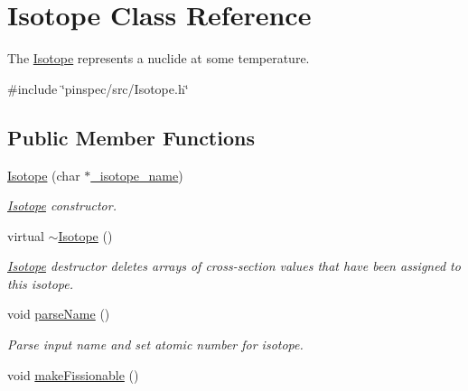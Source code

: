 \hypertarget{classIsotope}{\section{Isotope Class Reference}
\label{classIsotope}
}


The \hyperlink{classIsotope}{Isotope} represents a nuclide at some temperature.  




{\ttfamily \#include \char`\"{}pinspec/src/\-Isotope.\-h\char`\"{}}

\subsection*{Public Member Functions}
\begin{DoxyCompactItemize}
\item 
\hyperlink{classIsotope_a51ff93cb15b7956c86dcc7a80aec52f7}{Isotope} (char $\ast$\hyperlink{classIsotope_a073b0f7a2c59a676284d68dbdc588a6b}{\-\_\-isotope\-\_\-name})
\begin{DoxyCompactList}\small\item\em \hyperlink{classIsotope}{Isotope} constructor. \end{DoxyCompactList}\item 
\hypertarget{classIsotope_a7b22935e0ade348ee513733eeda1fa23}{virtual \hyperlink{classIsotope_a7b22935e0ade348ee513733eeda1fa23}{$\sim$\-Isotope} ()}\label{classIsotope_a7b22935e0ade348ee513733eeda1fa23}

\begin{DoxyCompactList}\small\item\em \hyperlink{classIsotope}{Isotope} destructor deletes arrays of cross-\/section values that have been assigned to this isotope. \end{DoxyCompactList}\item 
\hypertarget{classIsotope_a8f2edf586499fff80ecee7cbdc28bd0e}{void \hyperlink{classIsotope_a8f2edf586499fff80ecee7cbdc28bd0e}{parse\-Name} ()}\label{classIsotope_a8f2edf586499fff80ecee7cbdc28bd0e}

\begin{DoxyCompactList}\small\item\em Parse input name and set atomic number for isotope. \end{DoxyCompactList}\item 
\hypertarget{classIsotope_a9adedaf6a1bd4cee536c4684d6adaf65}{void \hyperlink{classIsotope_a9adedaf6a1bd4cee536c4684d6adaf65}{make\-Fissionable} ()}\label{classIsotope_a9adedaf6a1bd4cee536c4684d6adaf65}


\end{DoxyCompactItemize}
